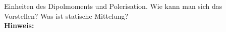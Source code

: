 \begin{question}[section=2,subsection=22,name={Mikroskopischer Ursprung von elektrischer und magnetischer Polerisation},difficulty=3,type=mdl,mode=exm,tags={}]
	Einheiten des Dipolmoments und Polerisation. Wie kann man sich das Vorstellen? Was ist statische Mittelung?
	\\ \textbf{Hinweis:}\\
	
\end{question}
\begin{solution}
	
\end{solution}
